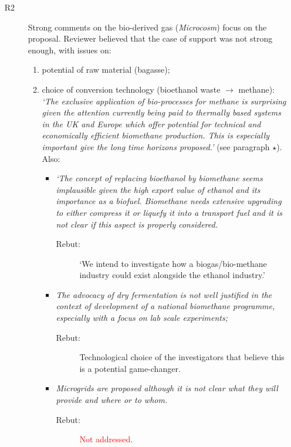 \documentclass[14pt,twoside]{report}
\begin{document}
\begin{enumerate}[(i)]
\begin{description}
\begin{description}
            \end{description}
          \item[R2] Strong comments on the bio-derived gas ({\it Microcosm}) focus on the proposal. Reviewer believed that the case of support was not strong enough, with issues on:
            \begin{enumerate}
                \item potential of raw material (bagasse);
                \item choice of conversion technology (bioethanol waste $\rightarrow$ methane): {\it `The exclusive application of bio-processes for methane is surprising given the attention currently being paid to thermally based systems in the UK and Europe which offer potential for technical and economically efficient biomethane production. This is especially important give the long time horizons proposed.'} (see paragraph $\star$). Also:
                   \begin{itemize}
                       \item {\it `The concept of replacing bioethanol by biomethane seems implausible given the high export value of ethanol and its importance as a biofuel. Biomethane needs extensive upgrading to either compress it or liquefy it into a transport fuel and it is not clear if this aspect is properly considered. } 
                          \begin{description}
                            \item[Rebut:] `We intend to investigate how a biogas/bio-methane industry could exist alongside the ethanol industry.'
                          \end{description}
                       \item {\it The advocacy of dry fermentation is not well justified in the context of development of a national biomethane programme, especially with a focus on lab scale experiments;}
                          \begin{description}
                            \item[Rebut:] Technological choice of the investigators that believe this is a potential game-changer.
                          \end{description}
                       \item {\it Microgrids are proposed although it is not clear what they will provide and where or to whom.}
                          \begin{description}
                            \item[Rebut:] \textcolor{red}{Not addressed}.

\end{description}
\end{itemize}
\end{enumerate}
\end{description}
\end{enumerate}
\end{document}
